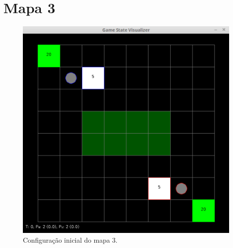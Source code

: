 \section{Mapa 3}

\begin{figure}[ht]
	\centering
	\includegraphics[width=.6\textwidth]{fig/map8x8obsta.pdf}
	\caption{Configuração inicial do mapa 3.}
	\label{fig:mapa8x8obsta}
\end{figure}

